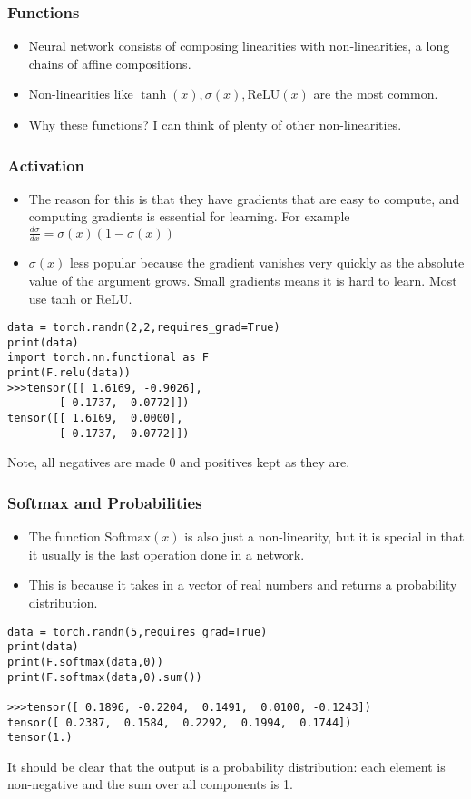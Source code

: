  
\begin{frame}[fragile]
\frametitle{Functions}

\begin{itemize}
\item Neural network consists of composing linearities with non-linearities, a long chains of affine compositions.
\item Non-linearities like $\tanh(x), \sigma(x), \text{ReLU}(x)$ are the most common.
\item Why these functions? I can think of plenty of other non-linearities.
\end{itemize}
\end{frame} 

\begin{frame}[fragile]
\frametitle{Activation}

\begin{itemize}
\item The reason for this is that they have gradients that are easy to compute, and computing gradients is essential for learning. For example $ \frac{d\sigma}{dx} = \sigma(x)(1 - \sigma(x)) $
\item $ \sigma(x)$ less popular because the gradient vanishes very quickly as the absolute value of the argument grows. Small gradients means it is hard to learn. Most use tanh or ReLU.
\end{itemize}
 \begin{lstlisting}
data = torch.randn(2,2,requires_grad=True)
print(data)
import torch.nn.functional as F
print(F.relu(data))
>>>tensor([[ 1.6169, -0.9026],
        [ 0.1737,  0.0772]])
tensor([[ 1.6169,  0.0000],
        [ 0.1737,  0.0772]])
 \end{lstlisting}
 Note, all negatives are made 0 and positives kept as they are.
\end{frame} 

\begin{frame}[fragile]
\frametitle{Softmax and Probabilities}

\begin{itemize}
\item The function $\text{Softmax}(x)$ is also just a non-linearity, but it is special in that it usually is the last operation done in a network. 
\item This is because it takes in a vector of real numbers and returns a probability distribution.
\end{itemize}
 \begin{lstlisting}
data = torch.randn(5,requires_grad=True)
print(data)
print(F.softmax(data,0))
print(F.softmax(data,0).sum())

>>>tensor([ 0.1896, -0.2204,  0.1491,  0.0100, -0.1243])
tensor([ 0.2387,  0.1584,  0.2292,  0.1994,  0.1744])
tensor(1.)
 \end{lstlisting}
It should be clear that the output is a probability distribution: each element is non-negative and the sum over all components is 1.
\end{frame} 


